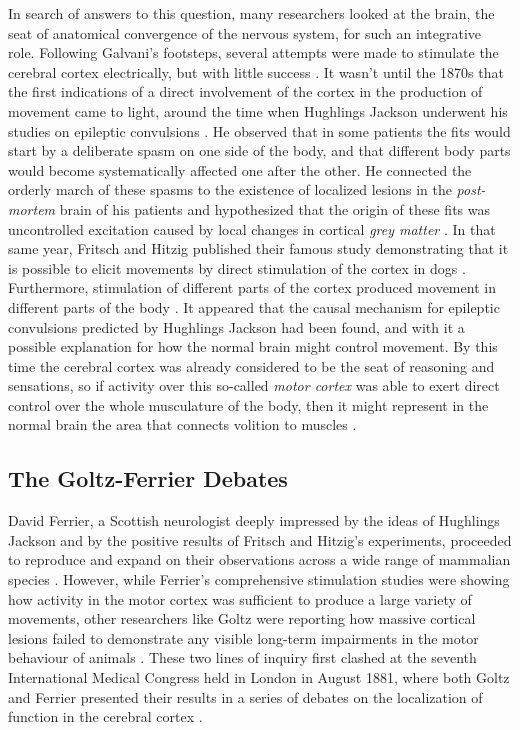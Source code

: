 In search of answers to this question, many researchers looked at the brain, the seat of anatomical convergence of the nervous system, for such an integrative role. Following Galvani's footsteps, several attempts were made to stimulate the cerebral cortex electrically, but with little success \cite{Gross2007}. It wasn't until the 1870s that the first indications of a direct involvement of the cortex in the production of movement came to light, around the time when Hughlings Jackson underwent his studies on epileptic convulsions \cite{Jackson1870}. He observed that in some patients the fits would start by a deliberate spasm on one side of the body, and that different body parts would become systematically affected one after the other. He connected the orderly march of these spasms to the existence of localized lesions in the \emph{post-mortem} brain of his patients and hypothesized that the origin of these fits was uncontrolled excitation caused by local changes in cortical \emph{grey matter} \cite{Jackson1870}. In that same year, Fritsch and Hitzig published their famous study demonstrating that it is possible to elicit movements by direct stimulation of the cortex in dogs \cite{Fritsch1870}. Furthermore, stimulation of different parts of the cortex produced movement in different parts of the body \cite{Fritsch1870}. It appeared that the causal mechanism for epileptic convulsions predicted by Hughlings Jackson had been found, and with it a possible explanation for how the normal brain might control movement. By this time the cerebral cortex was already considered to be the seat of reasoning and sensations, so if activity over this so-called \emph{motor cortex} was able to exert direct control over the whole musculature of the body, then it might represent in the normal brain the area that connects volition to muscles \cite{Fritsch1870}.

\subsection{The Goltz-Ferrier Debates}

David Ferrier, a Scottish neurologist deeply impressed by the ideas of Hughlings Jackson and by the positive results of Fritsch and Hitzig's experiments, proceeded to reproduce and expand on their observations across a wide range of mammalian species \cite{Ferrier1873}. However, while Ferrier's comprehensive stimulation studies were showing how activity in the motor cortex was sufficient to produce a large variety of movements, other researchers like Goltz were reporting how massive cortical lesions failed to demonstrate any visible long-term impairments in the motor behaviour of animals \cite{Goltz1888}. These two lines of inquiry first clashed at the seventh International Medical Congress held in London in August 1881, where both Goltz and Ferrier presented their results in a series of debates on the localization of function in the cerebral cortex \cite{Tyler2000}.

